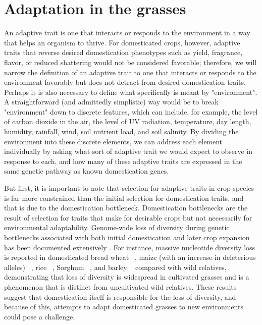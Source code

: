 \documentclass[12pt]{article}
\newcommand{\mbh}[1]{\textcolor{red}{\normalsize  #1}}
\begin{document}
\section*{Adaptation in the grasses}
An adaptive trait is one that interacts or responds to the environment in a way that helps an organism to thrive.
For domesticated crops, however, adaptive traits that reverse desired domestication phenotypes such as yield, fragrance, flavor, or reduced shattering would not be considered favorable; therefore, we will narrow the definition of an adaptive trait to one that interacts or responds to the environment favorably but does not detract from desired domestication traits.
Perhaps it is also necessary to define what specifically is meant by "environment".
A straightforward (and admittedly simplistic) way would be to break "environment" down to discrete features, which can include, for example, the level of carbon dioxide in the air, the level of UV radiation, temperature, day length, humidity, rainfall, wind, soil nutrient load, and soil salinity.
By dividing the environment into these discrete elements, we can address each element individually by asking what sort of adaptive trait we would expect to observe in response to each, and how many of these adaptive traits are expressed in the same genetic pathway as known domestication genes. 

But first, it is important to note that selection for adaptive traits in crop species is far more constrained than the initial selection for domestication traits, and that is due to the domestication bottleneck.
Domestication bottlenecks are the result of selection for traits that make for desirable crops but not necessarily for environmental adaptability.
Genome-wide loss of diversity during genetic bottlenecks associated with both initial domestication and later crop expansion has been documented extensively \cite{Wang2017}.
For instance, massive nucleotide diversity loss is reported in domesticated bread wheat ~\citep{Haudry2007}, maize (with an increase in deleterious alleles) ~\citep{pmid9539756, Wang2017}, rice ~\citep{pmid17218640}, Sorghum ~\citep{Hamblin2006}, and barley ~\citep{Kilian2006} compared with wild relatives, demonstrating that loss of diversity is widespread in cultivated grasses and is a phenomenon that is distinct from uncultivated wild relatives.
These results suggest that domestication itself is responsible for the loss of diversity, and because of this, attempts to adapt domesticated grasses to new environments could pose a challenge.  
\end{document}
